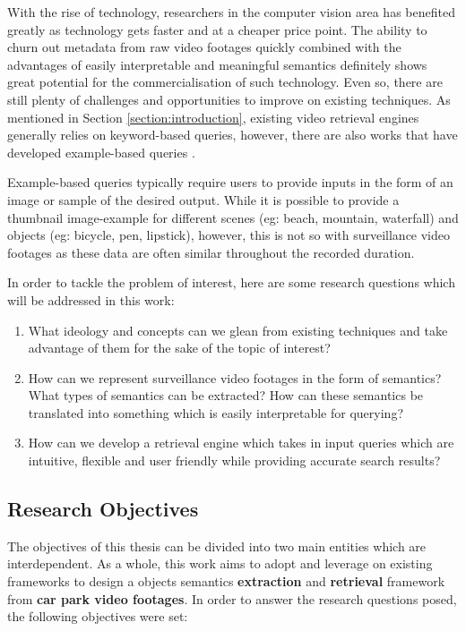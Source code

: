 With the rise of technology, researchers in the computer vision area has benefited greatly as technology gets faster and at a cheaper price point. The ability to churn out metadata from raw video footages quickly combined with the advantages of easily interpretable and meaningful semantics definitely shows great potential for the commercialisation of such technology. Even so, there are still plenty of challenges and opportunities to improve on existing techniques. As mentioned in Section \ref{section:introduction}, existing video retrieval engines generally relies on keyword-based queries, however, there are also works that have developed example-based queries \cite{zhang2017car, liu2016large, castanon2016retrieval}. 

Example-based queries typically require users to provide inputs in the form of an image or sample of the desired output. While it is possible to provide a thumbnail image-example for different scenes (eg: beach, mountain, waterfall) and objects (eg: bicycle, pen, lipstick), however, this is not so with surveillance video footages as these data are often similar throughout the recorded duration. 

In order to tackle the problem of interest, here are some research questions which will be addressed in this work:
\begin{enumerate}  
\item What ideology and concepts can we glean from existing techniques and take advantage of them for the sake of the topic of interest? 
\item How can we represent surveillance video footages in the form of semantics? What types of semantics can be extracted? How can these semantics be translated into something which is easily interpretable for querying?
\item How can we develop a retrieval engine which takes in input queries which are intuitive, flexible and user friendly while providing accurate search results? 
\end{enumerate}



\subsection{Research Objectives}
The objectives of this thesis can be divided into two main entities which are interdependent. As a whole, this work aims to adopt and leverage on existing frameworks to design a objects semantics \textbf{extraction} and \textbf{retrieval} framework from \textbf{car park video footages}. In order to answer the research questions posed, the following objectives were set:

